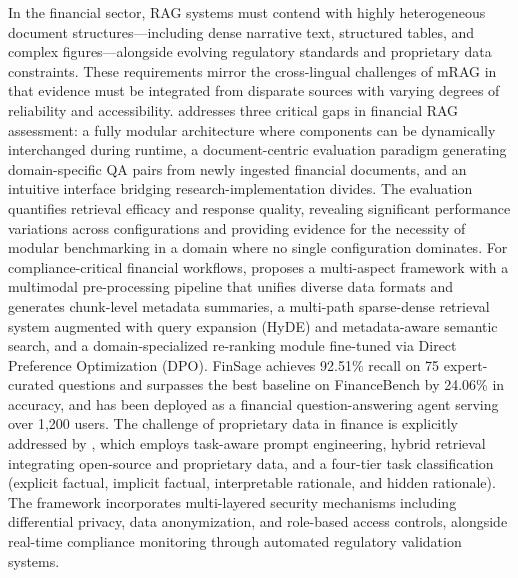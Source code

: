 \documentclass[11pt]{article}
\begin{document}
In the financial sector, RAG systems must contend with highly heterogeneous document structures---including dense narrative text, structured tables, and complex figures---alongside evolving regulatory standards and proprietary data constraints. These requirements mirror the cross-lingual challenges of mRAG in that evidence must be integrated from disparate sources with varying degrees of reliability and accessibility. \cite{ref397} addresses three critical gaps in financial RAG assessment: a fully modular architecture where components can be dynamically interchanged during runtime, a document-centric evaluation paradigm generating domain-specific QA pairs from newly ingested financial documents, and an intuitive interface bridging research-implementation divides. The evaluation quantifies retrieval efficacy and response quality, revealing significant performance variations across configurations and providing evidence for the necessity of modular benchmarking in a domain where no single configuration dominates. For compliance-critical financial workflows, \cite{ref398} proposes a multi-aspect framework with a multimodal pre-processing pipeline that unifies diverse data formats and generates chunk-level metadata summaries, a multi-path sparse-dense retrieval system augmented with query expansion (HyDE) and metadata-aware semantic search, and a domain-specialized re-ranking module fine-tuned via Direct Preference Optimization (DPO). FinSage achieves 92.51\% recall on 75 expert-curated questions and surpasses the best baseline on FinanceBench by 24.06\% in accuracy, and has been deployed as a financial question-answering agent serving over 1,200 users. The challenge of proprietary data in finance is explicitly addressed by \cite{ref399}, which employs task-aware prompt engineering, hybrid retrieval integrating open-source and proprietary data, and a four-tier task classification (explicit factual, implicit factual, interpretable rationale, and hidden rationale). The framework incorporates multi-layered security mechanisms including differential privacy, data anonymization, and role-based access controls, alongside real-time compliance monitoring through automated regulatory validation systems.
\end{document}
